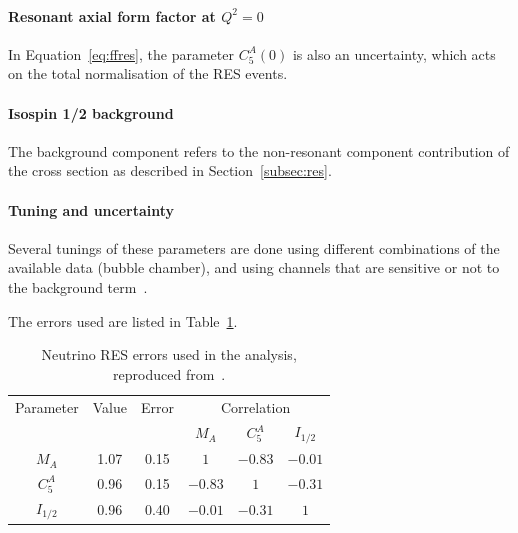 \paragraph{Resonant axial form factor at \texorpdfstring{$Q^2=0$}{TEXT}}
In Equation~\ref{eq:ffres}, the parameter $C^A_5(0)$ is also an
uncertainty, which acts on the total normalisation of the \Gls{RES}
events.

\paragraph{Isospin 1/2 background} The background component refers to
the non-resonant component contribution of the cross section as
described in Section~\ref{subsec:res}.

\paragraph{Tuning and uncertainty}
Several tunings of these parameters are done using different
combinations of the available data (bubble chamber), and using
channels that are sensitive or not to the background
term~\cite{TN315}.

The errors used are listed in Table~\ref{tab:reserror}.

\begin{table}[ht]
  \begin{adjustbox}{center}
    \begin{tabular}{cccccc}
      \toprule
      Parameter & Value & Error & \multicolumn{3}{c}{Correlation} \\
                &       &       & $M_A$   & $C_5^A$ & $I_{1/2}$ \\
      \midrule
      $M_A$     & 1.07  & 0.15  & $1$     & $-0.83$ & $-0.01$   \\
      $C_5^A$   & 0.96  & 0.15  & $-0.83$ & $1$     & $-0.31$   \\
      $I_{1/2}$ & 0.96  & 0.40  & $-0.01$ & $-0.31$ & $1$       \\
      \bottomrule
    \end{tabular}
  \end{adjustbox}
  \caption[Neutrino RES error used in the analysis]{Neutrino \Gls{RES}
    errors used in the analysis, reproduced from~\cite{TN315}.}
  \label{tab:reserror}
\end{table}

